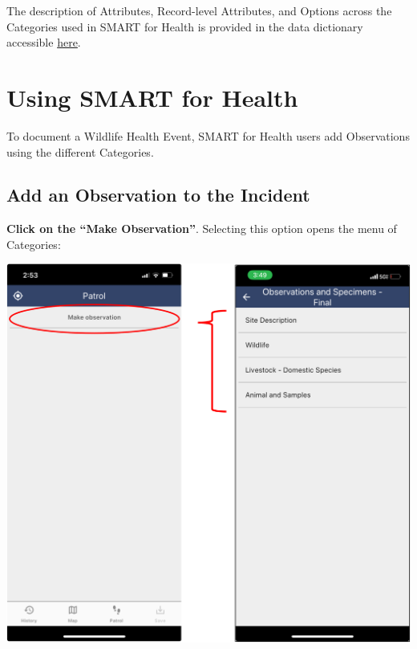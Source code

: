 \documentclass[
  letterpaper,
  DIV=11,
  numbers=noendperiod]{scrreprt}
\begin{document}
The description of Attributes, Record-level Attributes, and Options
across the Categories used in SMART for Health is provided in the data
dictionary accessible
\href{https://dmontecino.github.io/SMART_for_Heath_Rangers_Dictionary/Dictionary.html}{here}.

\hypertarget{using-smart-for-health}{%
\section*{Using SMART for Health}\label{using-smart-for-health}}


To document a Wildlife Health Event, SMART for Health users add
Observations using the different Categories.

\hypertarget{add-an-observation-to-the-incident}{%
\subsection*{Add an Observation to the
Incident}\label{add-an-observation-to-the-incident}}

\textbf{Click on the ``Make Observation''}. Selecting this option opens
the menu of Categories:

\includegraphics[width=5.83333in,height=\textheight]{Pictures_for_manual/Picture6.png}
\end{document}
